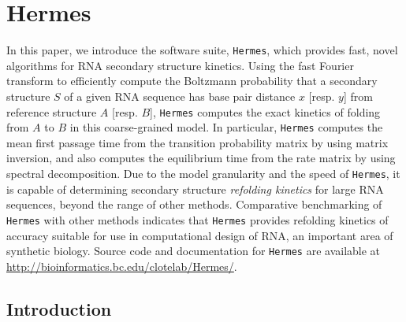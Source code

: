 
\newcommand{\mathbbP}{\mbox{\bf P}}
\newcommand{\mathbbt}{\mbox{\bf t}}
\newcommand{\Hermes}{\mbox{\tt Hermes}\xspace}
\newcommand{\FFTmfpt}{\mbox{\tt FFTmfpt}\xspace}
\newcommand{\FFTeq}{\mbox{\tt FFTeq}\xspace}
\newcommand{\FFTbor}{\mbox{\tt FFTbor}\xspace}
\newcommand{\FFTborTwoD}{\mbox{\tt FFTbor2D}\xspace}
\newcommand{\RNAmfpt}{\mbox{\tt RNAmfpt}\xspace}
\newcommand{\RNAeq}{\mbox{\tt RNAeq}\xspace}
\newcommand{\RNAsubopt}{\mbox{\tt RNAsubopt}\xspace}

\chapter{Hermes} %

\label{Hermes} %


In this paper, we introduce the software suite, {\tt Hermes}, which
provides fast, novel algorithms for RNA secondary structure kinetics.
Using the fast Fourier transform to efficiently compute the Boltzmann
probability that a secondary structure $S$ of a given RNA sequence has
base pair distance $x$ [resp. $y$] from reference structure $A$ [resp.
$B$], {\tt Hermes} computes the exact kinetics of folding from $A$ to
$B$ in this coarse-grained model. In particular, {\tt Hermes} computes
the mean first passage time from the transition probability matrix by
using matrix inversion, and also computes the equilibrium time from the
rate matrix by using spectral decomposition.
Due to the model granularity and the
speed of {\tt Hermes}, it is capable of determining secondary structure
{\em refolding kinetics} for large RNA sequences, beyond the range of
other methods.  Comparative benchmarking of {\tt Hermes} with other
methods indicates that
{\tt Hermes} provides
refolding kinetics of accuracy suitable for use in
computational design of RNA, an important area of synthetic
biology. Source code and documentation for {\tt Hermes} are available
at \url{http://bioinformatics.bc.edu/clotelab/Hermes/}.

\section{Introduction} \label{section:introduction}

